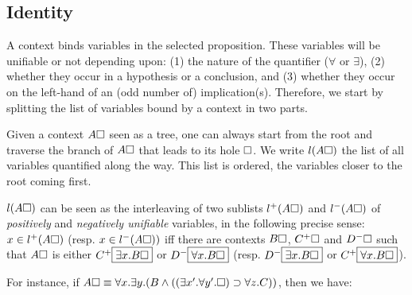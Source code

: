 \subsection{Identity}

A context binds variables in the selected proposition. These variables
will be unifiable or not depending upon: (1) the nature of the quantifier
($\forall$ or $\exists$), (2) whether they occur in a hypothesis or a
conclusion, and (3) whether they occur on the left-hand of an (odd number
of) implication(s). Therefore, we start by splitting the list of
variables bound by a context in two parts.


\begin{definition}
Given a context $A\square$ seen as a tree, one can always start from
the root and traverse the branch of $A\square$ that leads to its hole
$\square$. We write $l(A\square)$ the list of all variables
quantified along the way. This list is ordered, the variables closer
to the root coming first.

$l(A\square)$ can be seen as the interleaving of two sublists
$l^+(A\square)$ and $l^-(A\square)$ of \emph{positively} and
\emph{negatively unifiable} variables, in the following precise sense:
$x \in l^+(A\square)$ (resp. $x \in l^-(A\square))$ iff there
are contexts $B\square$, $C^+\square$ and $D^-\square$ such that
$A\square$ is either $C^+\fbox{$\exists x. B\square$}$ or
$D^-\fbox{$\forall x. B\square$}$ (resp. $D^-\fbox{$\exists x. B\square$}$
or $C^+\fbox{$\forall x. B\square$}$).

For instance, if $A\square \equiv \forall x. \exists y. (B \land ((\exists x'.
\forall y'. \square) \supset \forall z. C))$, then we have:


  

\end{definition}
